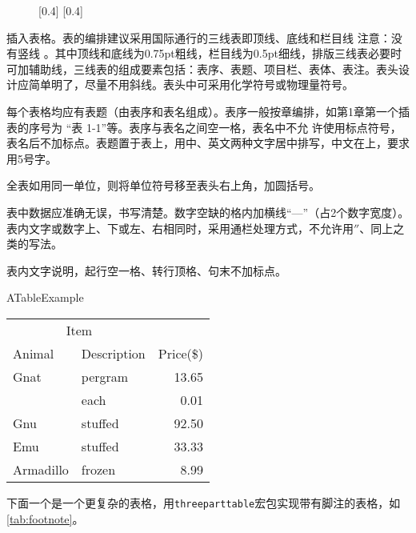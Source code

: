 \begin{figure}[htbp]
    \centering
    [0.4\textwidth]{}%
    \qquad
    [0.4\textwidth]{}%
    \label{fig:test3}
\end{figure}

插入表格。表的编排建议采用国际通行的三线表即顶线、底线和栏目线 注意：没有竖线 。其中顶线和底线为0.75pt粗线，栏目线为0.5pt细线，排版三线表必要时可加辅助线，三线表的组成要素包括：表序、表题、项目栏、表体、表注。表头设计应简单明了，尽量不用斜线。表头中可采用化学符号或物理量符号。

每个表格均应有表题（由表序和表名组成）。表序一般按章编排，如第1章第一个插表的序号为 “表 1-1”等。表序与表名之间空一格，表名中不允 许使用标点符号，表名后不加标点。表题置于表上，用中、英文两种文字居中排写，中文在上，要求用5号字。

全表如用同一单位，则将单位符号移至表头右上角，加圆括号。

表中数据应准确无误，书写清楚。数字空缺的格内加横线“—”（占2个数字宽度）。表内文字或数字上、下或左、右相同时，采用通栏处理方式，不允许用$ '' $、同上之类的写法。

表内文字说明，起行空一格、转行顶格、句末不加标点。
\begin{table}[!hpb]
	\centering
	{ATableExample}
	\label{tab:1st}
	\begin{tabular}{@{}llr@{}}\toprule
		\multicolumn{2}{c}{Item}\\\cmidrule(r){1-2}
		Animal&Description&Price(\$)\\\midrule
		Gnat&pergram&13.65\\
		&each&0.01\\
		Gnu&stuffed&92.50\\
		Emu&stuffed&33.33\\
		Armadillo&frozen&8.99\\\bottomrule
	\end{tabular}
\end{table}

下面一个是一个更复杂的表格，用\verb|threeparttable|宏包实现带有脚注的表格，如\cref{tab:footnote}。

